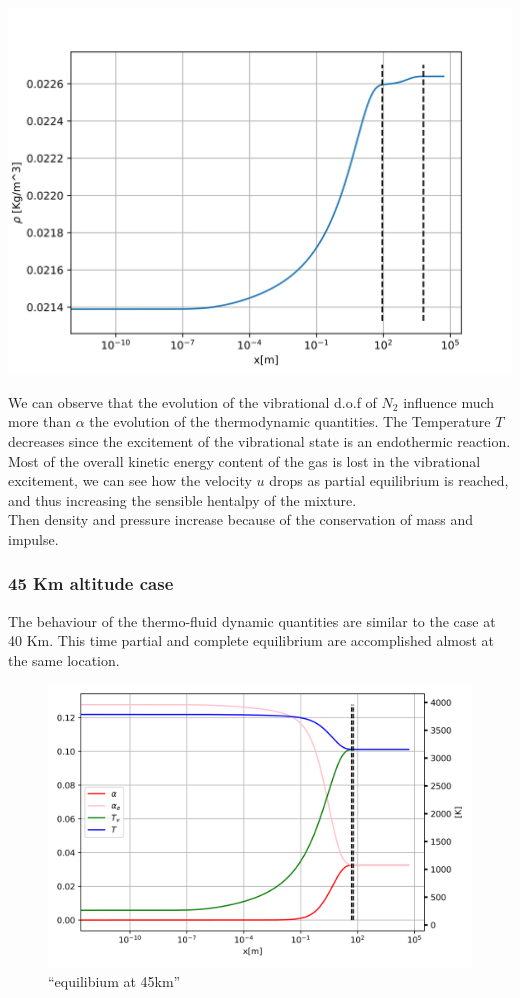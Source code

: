 \documentclass[
]{article}
\begin{document}
\includegraphics{images/40km/NequilibriumFlowNSW_rho.svg}

We can observe that the evolution of the vibrational d.o.f of \(N_2\)
influence much more than \(\alpha\) the evolution of the thermodynamic
quantities. The Temperature \(T\) decreases since the excitement of the
vibrational state is an endothermic reaction. Most of the overall
kinetic energy content of the gas is lost in the vibrational excitement,
we can see how the velocity \(u\) drops as partial equilibrium is
reached, and thus increasing the sensible hentalpy of the mixture.\\
Then density and pressure increase because of the conservation of mass
and impulse.

\hypertarget{km-altitude-case-1}{%
\subsubsection{45 Km altitude case}\label{km-altitude-case-1}}

The behaviour of the thermo-fluid dynamic quantities are similar to the
case at 40 Km. This time partial and complete equilibrium are
accomplished almost at the same location.

\begin{figure}
\centering
\includegraphics{images/45km/NequilibriumFlowNSW_T_alpha.svg}
\caption{``equilibium at 45km''}
\end{figure}
\end{document}
